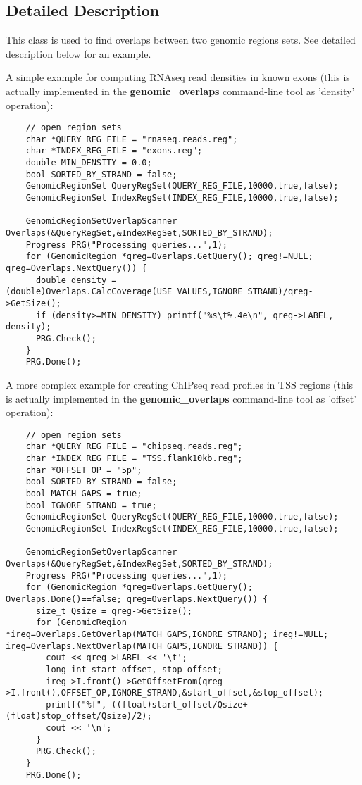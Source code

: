 \subsection{Detailed Description}
This class is used to find overlaps between two genomic regions sets. See detailed description below for an example. 

A simple example for computing RNAseq read densities in known exons (this is actually implemented in the {\bf genomic\_\-overlaps} command-line tool as 'density' operation): 

\begin{Code}\begin{verbatim}    // open region sets
    char *QUERY_REG_FILE = "rnaseq.reads.reg";
    char *INDEX_REG_FILE = "exons.reg";
    double MIN_DENSITY = 0.0;
    bool SORTED_BY_STRAND = false; 
    GenomicRegionSet QueryRegSet(QUERY_REG_FILE,10000,true,false);
    GenomicRegionSet IndexRegSet(INDEX_REG_FILE,10000,true,false);

    GenomicRegionSetOverlapScanner Overlaps(&QueryRegSet,&IndexRegSet,SORTED_BY_STRAND);
    Progress PRG("Processing queries...",1);
    for (GenomicRegion *qreg=Overlaps.GetQuery(); qreg!=NULL; qreg=Overlaps.NextQuery()) {
      double density = (double)Overlaps.CalcCoverage(USE_VALUES,IGNORE_STRAND)/qreg->GetSize(); 
      if (density>=MIN_DENSITY) printf("%s\t%.4e\n", qreg->LABEL, density);
      PRG.Check();
    }
    PRG.Done();
\end{verbatim}
\end{Code}

 A more complex example for creating ChIPseq read profiles in TSS regions (this is actually implemented in the {\bf genomic\_\-overlaps} command-line tool as 'offset' operation): 

\begin{Code}\begin{verbatim}    // open region sets
    char *QUERY_REG_FILE = "chipseq.reads.reg";
    char *INDEX_REG_FILE = "TSS.flank10kb.reg";
    char *OFFSET_OP = "5p";
    bool SORTED_BY_STRAND = false; 
    bool MATCH_GAPS = true;
    bool IGNORE_STRAND = true;
    GenomicRegionSet QueryRegSet(QUERY_REG_FILE,10000,true,false);
    GenomicRegionSet IndexRegSet(INDEX_REG_FILE,10000,true,false);

    GenomicRegionSetOverlapScanner Overlaps(&QueryRegSet,&IndexRegSet,SORTED_BY_STRAND);
    Progress PRG("Processing queries...",1);
    for (GenomicRegion *qreg=Overlaps.GetQuery(); Overlaps.Done()==false; qreg=Overlaps.NextQuery()) {
      size_t Qsize = qreg->GetSize();
      for (GenomicRegion *ireg=Overlaps.GetOverlap(MATCH_GAPS,IGNORE_STRAND); ireg!=NULL; ireg=Overlaps.NextOverlap(MATCH_GAPS,IGNORE_STRAND)) {
        cout << qreg->LABEL << '\t';
        long int start_offset, stop_offset;
        ireg->I.front()->GetOffsetFrom(qreg->I.front(),OFFSET_OP,IGNORE_STRAND,&start_offset,&stop_offset);
        printf("%f", ((float)start_offset/Qsize+(float)stop_offset/Qsize)/2); 
        cout << '\n';
      }
      PRG.Check();
    }
    PRG.Done();
\end{verbatim}
\end{Code}

